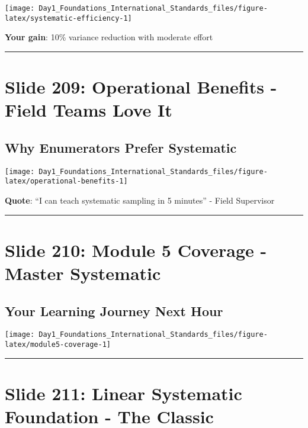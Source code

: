 \documentclass[
]{article}
\begin{document}
\texttt{[image: Day1\_Foundations\_International\_Standards\_files/figure-latex/systematic-efficiency-1]}

\textbf{Your gain}: 10\% variance reduction with moderate effort

\begin{center}\rule{0.5\linewidth}{0.5pt}\end{center}

\section{Slide 209: Operational Benefits - Field Teams Love
It}\label{slide-209-operational-benefits---field-teams-love-it}

\subsection{Why Enumerators Prefer
Systematic}\label{why-enumerators-prefer-systematic}

\texttt{[image: Day1\_Foundations\_International\_Standards\_files/figure-latex/operational-benefits-1]}

\textbf{Quote}: ``I can teach systematic sampling in 5 minutes'' - Field
Supervisor

\begin{center}\rule{0.5\linewidth}{0.5pt}\end{center}

\section{Slide 210: Module 5 Coverage - Master
Systematic}\label{slide-210-module-5-coverage---master-systematic}

\subsection{Your Learning Journey Next
Hour}\label{your-learning-journey-next-hour}

\texttt{[image: Day1\_Foundations\_International\_Standards\_files/figure-latex/module5-coverage-1]}

\begin{center}\rule{0.5\linewidth}{0.5pt}\end{center}

\section{Slide 211: Linear Systematic Foundation - The
Classic}\label{slide-211-linear-systematic-foundation---the-classic}
\end{document}
